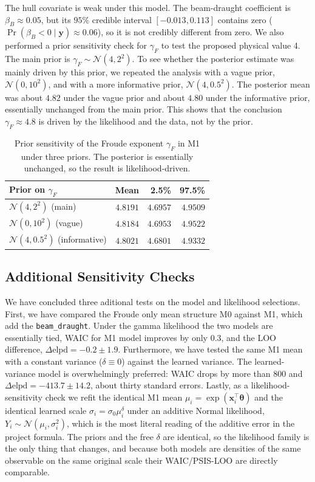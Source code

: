 \documentclass[12pt,a4paper]{article}
\begin{document}
The hull covariate is weak under this model. The beam-draught coefficient is
$\beta_B\approx0.05$, but its $95\%$ credible interval $[-0.013,0.113]$ contains
zero ($\Pr(\beta_B<0\mid\bm{y})\approx0.06$), so it is not credibly different from
zero. 
We also performed a prior sensitivity check for $\gamma_F$ to test the proposed physical value 4. 
The main prior is $\gamma_F\sim\mathcal N(4,2^2)$. To see whether the posterior estimate was mainly driven by this prior, 
we repeated the analysis with a vague prior, $\mathcal N(0,10^2)$, and with a more informative prior, $\mathcal N(4,0.5^2)$. 
The posterior mean was about $4.82$ under the vague prior and about $4.80$ under the informative prior, essentially unchanged from the main prior. This shows that the conclusion $\gamma_F\approx4.8$ is driven by the likelihood and the data, not by the prior.

\begin{table}[H]
  \centering
  \caption{Prior sensitivity of the Froude exponent $\gamma_F$ in M1 under three
    priors. The posterior is essentially unchanged, so the result is
    likelihood-driven.}
  \label{tab:t3-sens}
  \begin{tabular}{l r r r}
    \toprule
    \textbf{Prior on $\gamma_F$} & \textbf{Mean} & \textbf{2.5\%} & \textbf{97.5\%} \\
    \midrule
    $\mathcal{N}(4,2^2)$ (main)        & $4.8191$ & $4.6957$ & $4.9509$ \\
    $\mathcal{N}(0,10^2)$ (vague)      & $4.8184$ & $4.6953$ & $4.9522$ \\
    $\mathcal{N}(4,0.5^2)$ (informative) & $4.8021$ & $4.6801$ & $4.9332$ \\
    \bottomrule
  \end{tabular}
\end{table}

\subsection{Additional Sensitivity Checks}
We have concluded three aditional tests on the model and likelihood selections. First, we have compared the Froude only mean structure M0
against M1, which add the \texttt{beam\_draught}. Under the gamma likelihood the two models are essentially tied, WAIC for M1 model improves
by only $0.3$, and the LOO difference, $\Delta\mathrm{elpd}=-0.2\pm1.9$. Furthermore, we have tested the same M1 mean with a constant variance ($\delta\equiv0$) against the learned variance. The learned-variance model is overwhelmingly preferred: 
WAIC drops by more than $800$ and $\Delta\mathrm{elpd}=-413.7\pm14.2$, about thirty standard errors.
Lastly, as a likelihood-sensitivity check we refit
the identical M1 mean $\mu_i=\exp(\bm{x}_i^\top\bm{\theta})$ and the identical
learned scale $\sigma_i=\sigma_0\mu_i^{\delta}$ under an additive Normal
likelihood, $Y_i\sim\mathcal N(\mu_i,\sigma_i^2)$, which is the most literal
reading of the additive error in the project formula. The priors and the free
$\delta$ are identical, so the likelihood family is the only thing that changes,
and because both models are densities of the same observable on the same original
scale their WAIC/PSIS-LOO are directly comparable.
\end{document}
